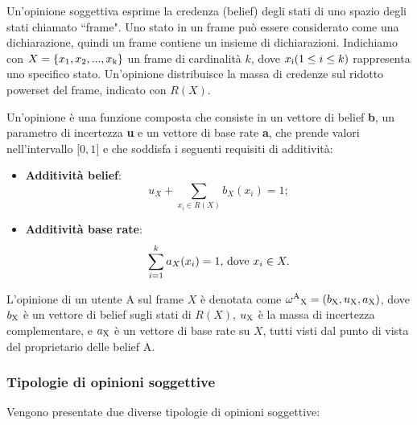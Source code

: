 \documentclass[letterpaper]{article} %
\begin{document}
Un'opinione soggettiva esprime la credenza (belief) degli stati di uno
spazio degli stati chiamato ``frame". Uno stato in un frame può essere
considerato come una dichiarazione, quindi un frame contiene un insieme
di dichiarazioni. Indichiamo con $X = \{x\textsubscript{1}, x\textsubscript{2}, ... , x\textsubscript{k}\}$ un frame di
cardinalità $k$, dove $x\textsubscript{i} (1\le i \le k)$ rappresenta uno
specifico stato. Un'opinione distribuisce la massa di credenze sul
ridotto powerset del frame, indicato con $R(X)$.

Un'opinione è una funzione composta che consiste in un vettore di belief
\textbf{b}, un parametro di incertezza \textbf{u} e un vettore di base
rate \textbf{a}, che prende valori nell'intervallo ${[}0,1{]}$ e che
soddisfa i seguenti requisiti di additività:

\begin{itemize}
	\item
	\textbf{Additività belief}: \begin{equation} u_X +\sum_{x_i \in R(X)}b_X(x_i)=1 \label{equazione1};\end{equation}
	\item
	\textbf{Additività base rate}: \begin{equation}\sum_{i=1}^k a_X(x_i)=1 \textnormal{, dove } x_i \in X \label{equazione2}.\end{equation}
\end{itemize}

L'opinione di un utente A sul frame $X$ è denotata come $\omega \textsuperscript{A}\textsubscript{X} =
(b\textsubscript{X},u\textsubscript{X},a\textsubscript{X})$, dove $b\textsubscript{X}$ è un vettore di belief sugli stati di $R(X)$,
$u\textsubscript{X}$ è la massa di incertezza complementare, e $a\textsubscript{X}$ è un vettore di base
rate su $X$, tutti visti dal punto di vista del proprietario delle belief
A.

\subsubsection{Tipologie di opinioni soggettive}

Vengono presentate due diverse tipologie di opinioni soggettive:
\end{document}
